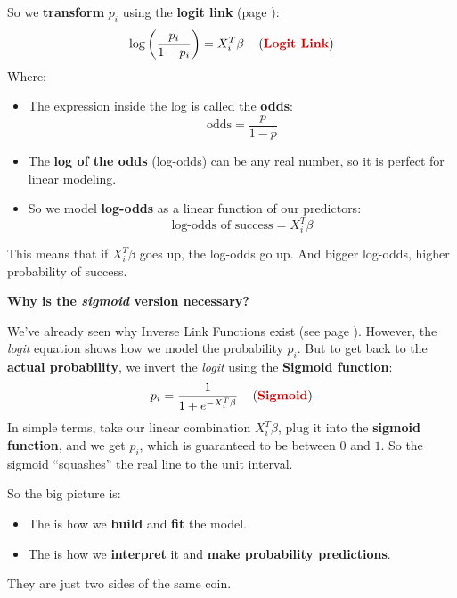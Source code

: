 \highspace
So we \textbf{transform} $p_i$ using the \textbf{logit link} (page \pageref{eq: Logit Link}):
\begin{equation*}
    \log \left( \dfrac{p_i}{1 - p_i} \right) = X_i^T \beta \quad \left(\definition{Logit Link}\right)
\end{equation*}
Where:
\begin{itemize}
    \item The expression inside the log is called the \textbf{odds}:
    \begin{equation*}
        \text{odds} = \dfrac{p}{1 - p}
    \end{equation*}

    \item The \textbf{log of the odds} (log-odds) can be any real number, so it is perfect for linear modeling.
    
    \item So we model \textbf{log-odds} as a linear function of our predictors:
    \begin{equation*}
        \text{log-odds of success} = X_i^T \beta
    \end{equation*}
\end{itemize}
This means that if $X_i^T \beta$ goes up, the log-odds go up. And bigger log-odds, higher probability of success.

\newpage

\begin{flushleft}
    \textcolor{Green3}{ \textbf{Why is the \emph{sigmoid} version necessary?}}
\end{flushleft}
We've already seen why Inverse Link Functions exist (see page \pageref{subsubsection: Inverse Link Function}). However, the \emph{logit} equation shows how we model the probability $p_i$. But to get back to the \textbf{actual probability}, we invert the \emph{logit} using the \textbf{Sigmoid function}:
\begin{equation*}
    p_i = \dfrac{1}{1 + e^{-X_i^T \beta}} \quad \left(\definition{Sigmoid}\right)
\end{equation*}
In simple terms, take our linear combination $X_i^T \beta$, plug it into the \textbf{sigmoid function}, and we get $p_i$, which is guaranteed to be between $0$ and $1$. So the sigmoid ``squashes'' the real line to the unit interval.

\begin{takeawaysbox}
    So the big picture is:
    \begin{itemize}
        \item The  is how we \textbf{build} and \textbf{fit} the model.
        \item The  is how we \textbf{interpret} it and \textbf{make probability predictions}.
    \end{itemize}
    They are just two sides of the same coin.
\end{takeawaysbox}